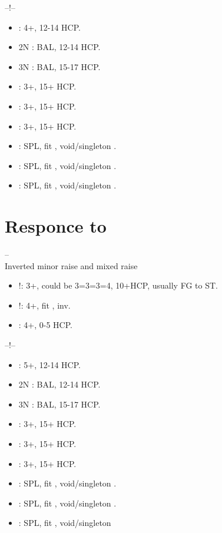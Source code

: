 \documentclass[12pt,twoside,a5paper]{report}%
\begin{document}
	--!--
	\begin{itemize}
	\renewcommand{\labelitemi}{}
	\item {} : 4+\cl{}, 12-14 HCP.
	\item 2N : BAL, 12-14 HCP.
	\item 3N : BAL, 15-17 HCP.
	\item {} : 3+\di{}, 15+ HCP.
	\item {} : 3+\he{}, 15+ HCP.
	\item {} : 3+\sp{}, 15+ HCP.
	\item {} : SPL, fit \cl{}, void/singleton \di{}.
	\item {} : SPL, fit \cl{}, void/singleton \he{}.
	\item {} : SPL, fit \cl{}, void/singleton \sp{}.
	\end{itemize}
	

\chapter*{Responce to }
	-- \\

	Inverted minor raise and mixed raise
	\begin{itemize}
	\renewcommand{\labelitemi}{}
	\item {}!: 3+\di{}, could be 3=3=3=4, 10+HCP, usually FG to ST. 
	\item {}!: 4+\di{}, fit \di{}, inv.  
	\item {} : 4+\di{}, 0-5 HCP. 
	\end{itemize}

	--!--
	\begin{itemize}
	\renewcommand{\labelitemi}{}
	\item {} : 5+\di{}, 12-14 HCP.
	\item 2N : BAL, 12-14 HCP.
	\item 3N : BAL, 15-17 HCP.
	\item {} : 3+\he{}, 15+ HCP.
	\item {} : 3+\sp{}, 15+ HCP.
	\item {} : 3+\cl{}, 15+ HCP.
	\item {} : SPL, fit \di{}, void/singleton \he{}.
	\item {} : SPL, fit \di{}, void/singleton \sp{}.
	\item {} : SPL, fit \di{}, void/singleton \cl{}
	\end{itemize}
\end{document}
